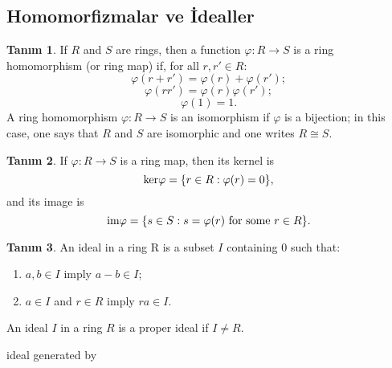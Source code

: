 \documentclass[draft]{article}
\theoremstyle{definition}
\newtheorem{defn}{Tanım}[section]
\theoremstyle{remark}
\begin{document}
        \subsection{Homomorfizmalar ve İdealler}
        	
        	\begin{defn}
    			If $R$ and $S$ are rings, then a function $\varphi : R \to S$ is a ring homomorphism (or ring map) if, for all $r, r' \in R$:
    			\begin{equation*}
    				\varphi(r + r') = \varphi(r) + \varphi(r');
    			\end{equation*}
    			\begin{equation*}
    				\varphi(rr') = \varphi(r)\varphi(r');
    			\end{equation*}
    			\begin{equation*}
    				\varphi(1) = 1.
    			\end{equation*}
    			A ring homomorphism $\varphi : R \to S$ is an isomorphism if $\varphi$ is a bijection; in this case, one says that $R$ and $S$ are isomorphic and one writes $R \cong S$.
    		\end{defn}
    		
    		\begin{defn}
    			If $\varphi : R \to S$ is a ring map, then its kernel is
    			\begin{equation*}
    				\textup{ker}\varphi = \{r \in R : \varphi(r) = 0\},
    			\end{equation*}
    			and its image is
    			\begin{equation*}
    				\textup{im}\varphi = \{s \in S : s = \varphi(r) \text{ for some } r \in R\}.
    			\end{equation*}
    		\end{defn}
    		
    		\begin{defn}
    			An ideal in a ring R is a subset $I$ containing $0$ such that:
    			\begin{enumerate}
    				\renewcommand{\labelenumi}{(\roman{enumi})}
    				\item $a, b \in I$ imply $a - b \in I$;
    				\item $a \in I$ and $r \in R$ imply $ra \in I$.
    			\end{enumerate}
    			An ideal $I$ in a ring $R$ is a proper ideal if $I \neq R$.
    		\end{defn}
    		
    		ideal generated by
    		
\end{document}
